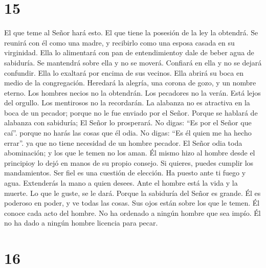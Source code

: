 \hypertarget{section-14}{%
\section{15}\label{section-14}}

 El que teme al Señor hará esto. El que tiene la posesión
de la ley la obtendrá.  Se reunirá con él como una madre,
y recibirlo como una esposa casada en su virginidad.  Ella
lo alimentará con pan de entendimientoy dale de beber agua de sabiduría.
 Se mantendrá sobre ella y no se moverá. Confiará en ella
y no se dejará confundir.  Ella lo exaltará por encima de
sus vecinos. Ella abrirá su boca en medio de la congregación.
 Heredará la alegría, una corona de gozo, y un nombre
eterno.  Los hombres necios no la obtendrán. Los pecadores
no la verán.  Está lejos del orgullo. Los mentirosos no la
recordarán.  La alabanza no es atractiva en la boca de un
pecador; porque no le fue enviado por el Señor.  Porque
se hablará de alabanza con sabiduría; El Señor lo prosperará.
 No digas: ``Es por el Señor que caí''. porque no harás
las cosas que él odia.  No digas: ``Es él quien me ha
hecho errar''. ya que no tiene necesidad de un hombre pecador.
 El Señor odia toda abominación; y los que le temen no
los aman.  Él mismo hizo al hombre desde el principioy lo
dejó en manos de su propio consejo.  Si quieres, puedes
cumplir los mandamientos. Ser fiel es una cuestión de elección.
 Ha puesto ante ti fuego y agua. Extenderás la mano a
quien desees.  Ante el hombre está la vida y la muerte.
Lo que le guste, se le dará.  Porque la sabiduría del
Señor es grande. Él es poderoso en poder, y ve todas las cosas.
 Sus ojos están sobre los que le temen. Él conoce cada
acto del hombre.  No ha ordenado a ningún hombre que sea
impío. Él no ha dado a ningún hombre licencia para pecar.

\hypertarget{section-15}{%
\section{16}\label{section-15}}

